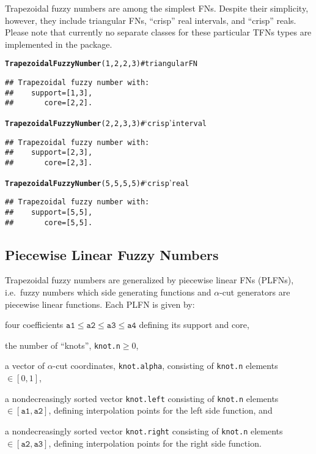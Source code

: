 \documentclass[11pt]{article}\usepackage{graphicx, color}
\makeatletter
\newcommand{\hlfunctioncall}[1]{\textcolor[rgb]{0.501960784313725,0,0.329411764705882}{\textbf{#1}}}%
\newcommand{\hlcomment}[1]{\textcolor[rgb]{0.180392156862745,0.6,0.341176470588235}{#1}}%
\newenvironment{kframe}{%
 \def\at@end@of@kframe{}%
 \ifinner\ifhmode%
  \def\at@end@of@kframe{\end{minipage}}%
  \begin{minipage}{\columnwidth}%
 \fi\fi%
 \def\FrameCommand##1{\hskip\@totalleftmargin \hskip-\fboxsep
 \colorbox{shadecolor}{##1}\hskip-\fboxsep
     \hskip-\linewidth \hskip-\@totalleftmargin \hskip\columnwidth}%
 \MakeFramed {\advance\hsize-\width
   \@totalleftmargin\z@ \linewidth\hsize
   \@setminipage}}%
 {\par\unskip\endMakeFramed%
 \at@end@of@kframe}
\newenvironment{knitrout}{}{} %
\makeatother
\begin{document}
\bigskip\noindent
Trapezoidal fuzzy numbers are among the simplest FNs.
Despite their simplicity, however, they include triangular FNs,
``crisp'' real intervals, and ``crisp'' reals.
Please note that currently no separate classes for these particular TFNs types
are implemented in the package.

\begin{knitrout}\small
{}\color{fgcolor}\begin{kframe}
\begin{alltt}
\hlfunctioncall{TrapezoidalFuzzyNumber}(1,2,2,3)  \hlcomment{# triangular FN}
\end{alltt}
\begin{verbatim}
## Trapezoidal fuzzy number with:
##    support=[1,3],
##       core=[2,2].
\end{verbatim}
\begin{alltt}
\hlfunctioncall{TrapezoidalFuzzyNumber}(2,2,3,3)  \hlcomment{# `crisp' interval}
\end{alltt}
\begin{verbatim}
## Trapezoidal fuzzy number with:
##    support=[2,3],
##       core=[2,3].
\end{verbatim}
\begin{alltt}
\hlfunctioncall{TrapezoidalFuzzyNumber}(5,5,5,5)  \hlcomment{# `crisp' real}
\end{alltt}
\begin{verbatim}
## Trapezoidal fuzzy number with:
##    support=[5,5],
##       core=[5,5].
\end{verbatim}
\end{kframe}
\end{knitrout}





\subsection{Piecewise Linear Fuzzy Numbers}

Trapezoidal fuzzy numbers are generalized by piecewise linear FNs (PLFNs),
i.e.~fuzzy numbers which side generating functions and $\alpha$-cut
generators are piecewise linear functions.
Each PLFN is given by:
\begin{itemize*}
\item four coefficients $\mathtt{a1}\le\mathtt{a2}\le\mathtt{a3}\le\mathtt{a4}$
defining its support and core,
\item the number of ``knots'', \texttt{knot.n}$\ge 0$,
\item a vector of $\alpha$-cut coordinates, \texttt{knot.alpha}, consisting of \texttt{knot.n} elements $\in[0,1]$,
\item a nondecreasingly sorted vector \texttt{knot.left} consisting of \texttt{knot.n} elements $\in[\mathtt{a1},\mathtt{a2}]$,
defining interpolation points for the left side function, and
\item a nondecreasingly sorted vector \texttt{knot.right} consisting of \texttt{knot.n} elements $\in[\mathtt{a2},\mathtt{a3}]$,
defining interpolation points for the right side function.
\end{itemize*}
\end{document}
